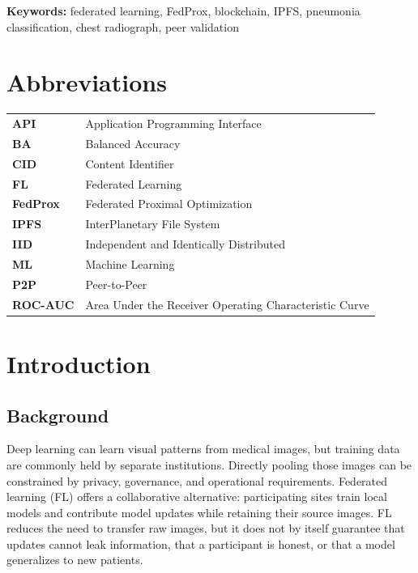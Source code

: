 \documentclass[12pt,a4paper]{report}
\begin{document}
\noindent\textbf{Keywords:} federated learning, FedProx, blockchain, IPFS, pneumonia classification, chest radiograph, peer validation

\newpage
\tableofcontents
\newpage
{}
\listoffigures
\newpage
{}
\listoftables
\newpage
\chapter*{Abbreviations}
\begin{tabularx}{\textwidth}{>{\bfseries}p{}Y}
API & Application Programming Interface \\
BA & Balanced Accuracy \\
CID & Content Identifier \\
FL & Federated Learning \\
FedProx & Federated Proximal Optimization \\
IPFS & InterPlanetary File System \\
IID & Independent and Identically Distributed \\
ML & Machine Learning \\
P2P & Peer-to-Peer \\
ROC-AUC & Area Under the Receiver Operating Characteristic Curve \\
\end{tabularx}

\newpage
{}
\def\theHpage{arabic.\arabic{page}}
\doublespacing

\chapter{Introduction}
\section{Background}
Deep learning can learn visual patterns from medical images, but training data are commonly held by separate institutions. Directly pooling those images can be constrained by privacy, governance, and operational requirements. Federated learning (FL) offers a collaborative alternative: participating sites train local models and contribute model updates while retaining their source images. FL reduces the need to transfer raw images, but it does not by itself guarantee that updates cannot leak information, that a participant is honest, or that a model generalizes to new patients.
\end{document}
